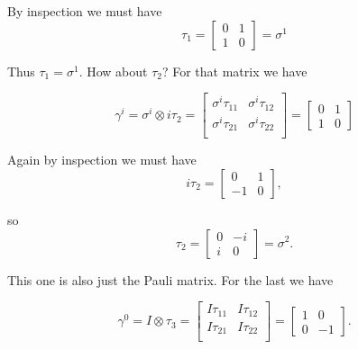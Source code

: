 By inspection we must have
\begin{equation}\label{eqn:zeeTauMatrix:30}
\tau_1 = 
\begin{bmatrix}
0 & 1 \\
1 & 0
\end{bmatrix}
= \sigma^1
\end{equation}

Thus $\tau_1 = \sigma^1$.  How about $\tau_2$?  For that matrix we have

\begin{equation}\label{eqn:zeeTauMatrix:50}
\gamma^i = \sigma^i \otimes i \tau_2 =
\begin{bmatrix}
\sigma^i \tau_{11} & \sigma^i \tau_{12} \\
\sigma^i \tau_{21} & \sigma^i \tau_{22} \\
\end{bmatrix}
= 
\begin{bmatrix}
0 & 1 \\
1 & 0
\end{bmatrix}
\end{equation}

Again by inspection we must have
\begin{equation}\label{eqn:zeeTauMatrix:70}
i \tau_2 = 
\begin{bmatrix}
0 & 1 \\
-1 & 0
\end{bmatrix},
\end{equation}

so
\begin{equation}\label{eqn:zeeTauMatrix:90}
\tau_2 = 
\begin{bmatrix}
0 & -i \\
i & 0
\end{bmatrix}
= \sigma^2.
\end{equation}

This one is also just the Pauli matrix.  For the last we have

\begin{equation}\label{eqn:zeeTauMatrix:110}
\gamma^0 = I \otimes \tau_3 =
\begin{bmatrix}
I \tau_{11} & I \tau_{12} \\
I \tau_{21} & I \tau_{22} \\
\end{bmatrix}
= 
\begin{bmatrix}
1 & 0 \\
0 & -1
\end{bmatrix}.
\end{equation}

